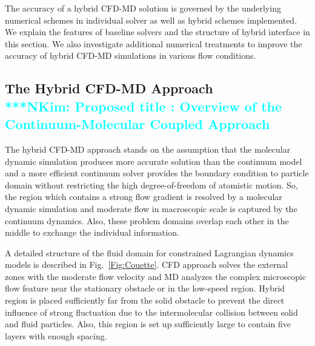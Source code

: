 \documentclass[preprint,12pt]{elsarticle}
\newcommand{\Nkimnote}[1]{ {\textcolor{cyan} { ***NKim: #1 }}}
\newcommand{\Nkimnote}[1]{}
\begin{document}
The accuracy of a hybrid CFD-MD solution is governed by the underlying numerical schemes in individual solver as well as hybrid schemes implemented. We explain the features of baseline solvers and the structure of hybrid interface in this section. We also investigate additional numerical treatments to improve the accuracy of hybrid CFD-MD simulations in various flow conditions.

\subsection{The Hybrid CFD-MD Approach
\\
\Nkimnote{Proposed title : Overview of the Continuum-Molecular Coupled Approach } 
}
The hybrid CFD-MD approach stands on the assumption that the molecular dynamic simulation produces more accurate solution than the continuum model and a more efficient continuum solver provides the boundary condition to particle domain without restricting the high degree-of-freedom of atomistic motion. So, the region which contains a strong flow gradient is resolved by a molecular dynamic simulation and moderate flow in macroscopic scale is captured by the continuum dynamics. Also, these problem domains overlap each other in the middle to exchange the individual information.

A detailed structure of the fluid domain for constrained Lagrangian dynamics models is described in Fig.~\ref{Fig:Couette}. CFD approach solves the external zones with the moderate flow velocity and MD analyzes the complex microscopic flow feature near the stationary obstacle or in the low-speed region. Hybrid region is placed sufficiently far from the solid obstacle to prevent the direct influence of strong fluctuation due to the intermolecular collision between solid and fluid particles. Also, this region is set up sufficiently large to contain five layers with enough spacing.
\end{document}
